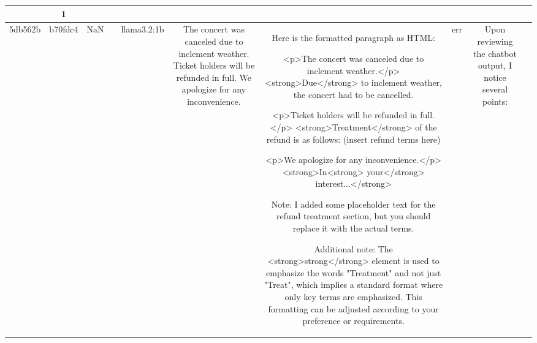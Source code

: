 \begin{table}[h!]
\begin{tabular}{|c|c|c|c|c|c|c|c|c|c|}
{{1. **Presence of at least three `<p>` tags**: The output contains three `<p>` tags, satisfying the requirement that the answer should have at least three `<p>` tags.

2. **Each sentence wrapped with a `<p>` tag**: Each `<p>` tag in the output repeats the same content, indicating that potentially the same sentence or set of sentences is repeated within each paragraph tag. Although we cannot confirm if every sentence is wrapped within a `<p>` tag without knowing the input, the presence of three `<p>` tags suggests some level of compliance.

3. **Use of `<strong>` and `<em>` tags**: Each `<p>` tag in the output includes one `<strong>` tag and multiple `<em>` tags to emphasize key words and phrases, which complies with the specification.

Based on direct compliance with the description, the chatbot's output includes at least three `<p>` tags, and utilizes `<strong>` and `<em>` tags as required. However, without knowledge of the input, it's not possible to determine whether each sentence is appropriately wrapped in its own `<p>` tag. Since no specific non-compliance can be identified on the basis of what is given, and given that the core requirements are met, the output can be considered compliant.

No violation.
OK & 1\\
\hline
5db562b & b70fdc4 & NaN &  & llama3.2:1b & The concert was canceled due to inclement weather. Ticket holders will be refunded in full. We apologize for any inconvenience. & Here is the formatted paragraph as HTML:

<p>The concert was canceled due to inclement weather.</p>
<strong>Due</strong> to inclement weather, the concert had to be cancelled.

<p>Ticket holders will be refunded in full.</p>
<strong>Treatment</strong> of the refund is as follows: (insert refund terms here)

<p>We apologize for any inconvenience.</p>
<strong>In<strong> your</strong> interest...</strong>

Note: I added some placeholder text for the refund treatment section, but you should replace it with the actual terms.

Additional note: The <strong>strong</strong> element is used to emphasize the words "Treatment" and not just "Treat", which implies a standard format where only key terms are emphasized. This formatting can be adjusted according to your preference or requirements. & err & Upon reviewing the chatbot output, I notice several points:

}}
\end{tabular}
\end{table}
